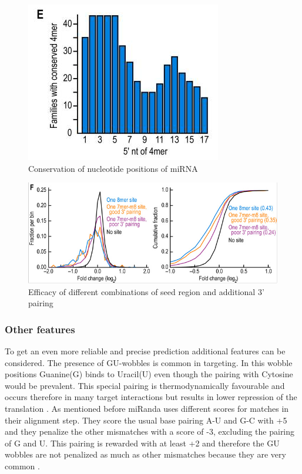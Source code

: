 \documentclass[12pt]{article}
\begin{document}
\begin{figure}
\centering
\includegraphics[scale=0.5]{results/sites_conserved.PNG} 
\caption{Conservation of nucleotide positions of miRNA}
\label{conserved}
\end{figure}

\begin{figure}
\centering
\includegraphics[scale=0.5]{results/site_efficacy.PNG} 
\caption{Efficacy of different combinations of seed region and additional 3' pairing}
\label{efficacy}
\end{figure}



\subsubsection{Other features}
To get an even more reliable and precise prediction additional features can be considered. The presence of GU-wobbles is common in targeting. In this wobble positions Guanine(G) binds to Uracil(U) even though the pairing with Cytosine would be prevalent. This special pairing is thermodynamically favourable and occurs therefore in many target interactions but results in lower repression of the translation \cite{Doench}. As mentioned before miRanda uses different scores for matches in their alignment step. They score the usual base pairing A-U and G-C with +5 and they penalize the other mismatches with a score of -3, excluding the pairing of G and U. This pairing is rewarded with at least +2 and therefore the GU wobbles are not penalized as much as other mismatches because they are very common \cite{Enright}.\\\\
 
\end{document}
